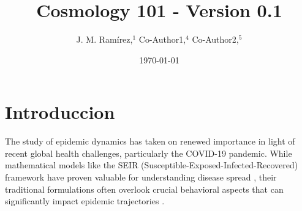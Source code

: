 \documentclass{article}\usepackage{graphicx} \usepackage{amsmath} \usepackage{colortbl}\title{Cosmology 101 - Version 0.1}
\author{J. M. Ram{\'i}rez,$^{1}$ Co-Author1,$^{4}$ Co-Author2,$^{5}$}
\date{\today}
\begin{document}
\maketitle\begin{abstract} 
\end{abstract}\section{Introduccion}
The study of epidemic dynamics has taken on renewed importance in light of recent global health challenges, particularly the COVID-19 pandemic. While mathematical models like the SEIR (Susceptible-Exposed-Infected-Recovered) framework have proven valuable for understanding disease spread \cite{kermack1927contribution}, their traditional formulations often overlook crucial behavioral aspects that can significantly impact epidemic trajectories \cite{funk2010modelling}.
\end{document}
